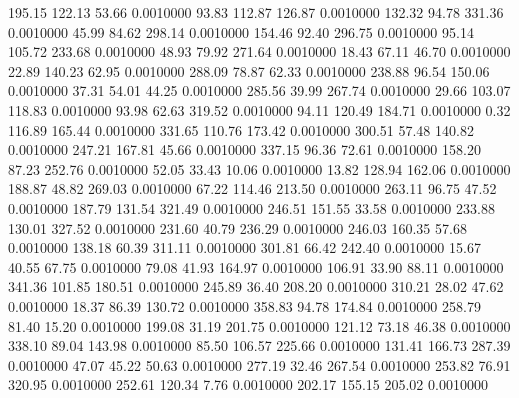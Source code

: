  195.15  122.13   53.66   0.0010000
  93.83  112.87  126.87   0.0010000
 132.32   94.78  331.36   0.0010000
  45.99   84.62  298.14   0.0010000
 154.46   92.40  296.75   0.0010000
  95.14  105.72  233.68   0.0010000
  48.93   79.92  271.64   0.0010000
  18.43   67.11   46.70   0.0010000
  22.89  140.23   62.95   0.0010000
 288.09   78.87   62.33   0.0010000
 238.88   96.54  150.06   0.0010000
  37.31   54.01   44.25   0.0010000
 285.56   39.99  267.74   0.0010000
  29.66  103.07  118.83   0.0010000
  93.98   62.63  319.52   0.0010000
  94.11  120.49  184.71   0.0010000
   0.32  116.89  165.44   0.0010000
 331.65  110.76  173.42   0.0010000
 300.51   57.48  140.82   0.0010000
 247.21  167.81   45.66   0.0010000
 337.15   96.36   72.61   0.0010000
 158.20   87.23  252.76   0.0010000
  52.05   33.43   10.06   0.0010000
  13.82  128.94  162.06   0.0010000
 188.87   48.82  269.03   0.0010000
  67.22  114.46  213.50   0.0010000
 263.11   96.75   47.52   0.0010000
 187.79  131.54  321.49   0.0010000
 246.51  151.55   33.58   0.0010000
 233.88  130.01  327.52   0.0010000
 231.60   40.79  236.29   0.0010000
 246.03  160.35   57.68   0.0010000
 138.18   60.39  311.11   0.0010000
 301.81   66.42  242.40   0.0010000
  15.67   40.55   67.75   0.0010000
  79.08   41.93  164.97   0.0010000
 106.91   33.90   88.11   0.0010000
 341.36  101.85  180.51   0.0010000
 245.89   36.40  208.20   0.0010000
 310.21   28.02   47.62   0.0010000
  18.37   86.39  130.72   0.0010000
 358.83   94.78  174.84   0.0010000
 258.79   81.40   15.20   0.0010000
 199.08   31.19  201.75   0.0010000
 121.12   73.18   46.38   0.0010000
 338.10   89.04  143.98   0.0010000
  85.50  106.57  225.66   0.0010000
 131.41  166.73  287.39   0.0010000
  47.07   45.22   50.63   0.0010000
 277.19   32.46  267.54   0.0010000
 253.82   76.91  320.95   0.0010000
 252.61  120.34    7.76   0.0010000
 202.17  155.15  205.02   0.0010000
